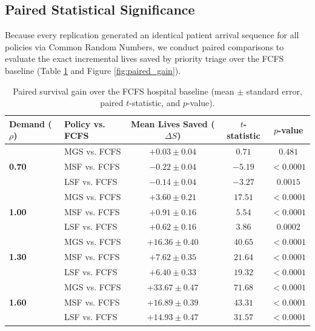 \documentclass{ro}
\begin{document}
\subsection{Paired Statistical Significance}

Because every replication generated an identical patient arrival sequence for all policies via Common Random Numbers, we conduct paired comparisons to evaluate the exact incremental lives saved by priority triage over the FCFS baseline (Table \ref{tab:paired_stats} and Figure \ref{fig:paired_gain}).

\begin{table}[ht]
\centering
\caption{Paired survival gain over the FCFS hospital baseline (mean $\pm$ standard error, paired $t$-statistic, and $p$-value).}
\label{tab:paired_stats}
\begin{tabular}{llccc}
\toprule
\textbf{Demand ($\rho$)} & \textbf{Policy vs. FCFS} & \textbf{Mean Lives Saved ($\Delta S$)} & \textbf{$t$-statistic} & \textbf{$p$-value} \\
\midrule
\multirow{3}{*}{\textbf{0.70}} 
 & MGS vs. FCFS & $+0.03 \pm 0.04$ & $0.71$  & $0.481$ \\
 & MSF vs. FCFS & $-0.22 \pm 0.04$ & $-5.19$ & $< 0.0001$ \\
 & LSF vs. FCFS & $-0.14 \pm 0.04$ & $-3.27$ & $0.0015$ \\
\midrule
\multirow{3}{*}{\textbf{1.00}} 
 & MGS vs. FCFS & $\mathbf{+3.60 \pm 0.21}$ & $17.51$ & $< 0.0001$ \\
 & MSF vs. FCFS & $+0.91 \pm 0.16$ & $5.54$  & $< 0.0001$ \\
 & LSF vs. FCFS & $+0.62 \pm 0.16$ & $3.86$  & $0.0002$ \\
\midrule
\multirow{3}{*}{\textbf{1.30}} 
 & MGS vs. FCFS & $\mathbf{+16.36 \pm 0.40}$ & $40.65$ & $< 0.0001$ \\
 & MSF vs. FCFS & $+7.62 \pm 0.35$ & $21.64$ & $< 0.0001$ \\
 & LSF vs. FCFS & $+6.40 \pm 0.33$ & $19.32$ & $< 0.0001$ \\
\midrule
\multirow{3}{*}{\textbf{1.60}} 
 & MGS vs. FCFS & $\mathbf{+33.67 \pm 0.47}$ & $71.68$ & $< 0.0001$ \\
 & MSF vs. FCFS & $+16.89 \pm 0.39$ & $43.31$ & $< 0.0001$ \\
 & LSF vs. FCFS & $+14.93 \pm 0.47$ & $31.57$ & $< 0.0001$ \\
\bottomrule
\end{tabular}
\end{table}
\end{document}
